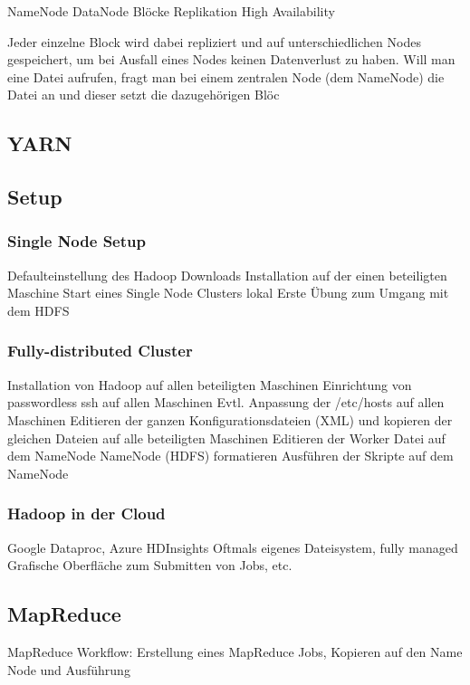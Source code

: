 NameNode
DataNode
Blöcke
Replikation
High Availability

Jeder einzelne Block wird dabei repliziert und auf unterschiedlichen Nodes gespeichert, um bei Ausfall eines Nodes keinen Datenverlust zu haben. Will man eine Datei aufrufen, fragt man bei einem zentralen Node (dem NameNode) die Datei an und dieser setzt die dazugehörigen Blöc


\subsection{YARN}


\subsection{Setup}
\subsubsection*{Single Node Setup}
Defaulteinstellung des Hadoop Downloads
Installation auf der einen beteiligten Maschine
Start eines Single Node Clusters lokal
Erste Übung zum Umgang mit dem HDFS
\subsubsection*{Fully-distributed Cluster}
Installation von Hadoop auf allen beteiligten Maschinen
Einrichtung von passwordless ssh auf allen Maschinen
Evtl. Anpassung der /etc/hosts auf allen Maschinen
Editieren der ganzen Konfigurationsdateien (XML) und kopieren der gleichen Dateien auf alle beteiligten Maschinen
Editieren der Worker Datei auf dem NameNode
NameNode (HDFS) formatieren
Ausführen der Skripte auf dem NameNode

\subsubsection*{Hadoop in der Cloud}
Google Dataproc, Azure HDInsights
Oftmals eigenes Dateisystem, fully managed
Grafische Oberfläche zum Submitten von Jobs, etc.

\subsection{MapReduce}
MapReduce Workflow: Erstellung eines MapReduce Jobs, Kopieren auf den Name Node und Ausführung
